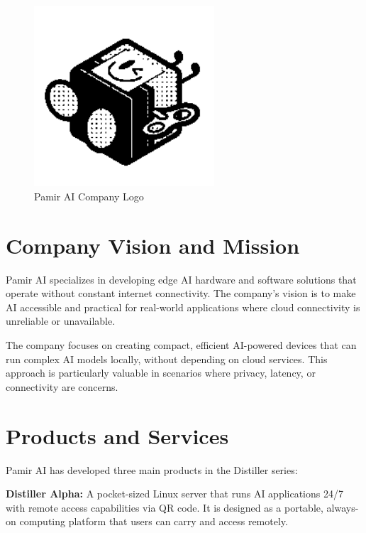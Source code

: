 \documentclass[12pt,a4paper]{report}
\begin{document}
\begin{figure}[h]
    \centering
    \includegraphics[width=0.6\textwidth]{pamirai_logo.png}
    \caption{Pamir AI Company Logo}
\end{figure}

\section{Company Vision and Mission}

Pamir AI specializes in developing edge AI hardware and software solutions that operate without constant internet connectivity. The company's vision is to make AI accessible and practical for real-world applications where cloud connectivity is unreliable or unavailable.

\vspace{0.3cm}

The company focuses on creating compact, efficient AI-powered devices that can run complex AI models locally, without depending on cloud services. This approach is particularly valuable in scenarios where privacy, latency, or connectivity are concerns.

\section{Products and Services}

Pamir AI has developed three main products in the Distiller series:

\vspace{0.3cm}

\textbf{Distiller Alpha:} A pocket-sized Linux server that runs AI applications 24/7 with remote access capabilities via QR code. It is designed as a portable, always-on computing platform that users can carry and access remotely.
\end{document}
